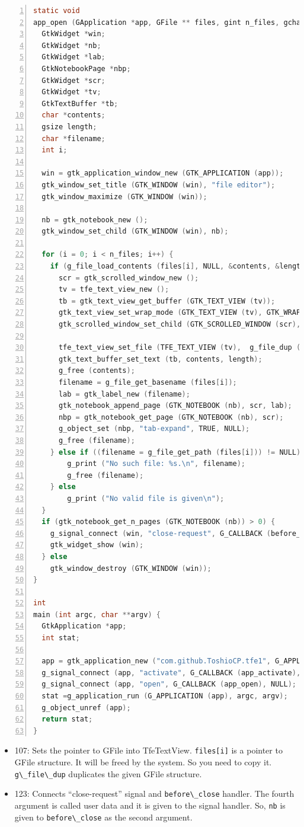 \begin{lstlisting}[language=C, numbers=left]
static void
app_open (GApplication *app, GFile ** files, gint n_files, gchar *hint, gpointer user_data) {
  GtkWidget *win;
  GtkWidget *nb;
  GtkWidget *lab;
  GtkNotebookPage *nbp;
  GtkWidget *scr;
  GtkWidget *tv;
  GtkTextBuffer *tb;
  char *contents;
  gsize length;
  char *filename;
  int i;

  win = gtk_application_window_new (GTK_APPLICATION (app));
  gtk_window_set_title (GTK_WINDOW (win), "file editor");
  gtk_window_maximize (GTK_WINDOW (win));

  nb = gtk_notebook_new ();
  gtk_window_set_child (GTK_WINDOW (win), nb);

  for (i = 0; i < n_files; i++) {
    if (g_file_load_contents (files[i], NULL, &contents, &length, NULL, NULL)) {
      scr = gtk_scrolled_window_new ();
      tv = tfe_text_view_new ();
      tb = gtk_text_view_get_buffer (GTK_TEXT_VIEW (tv));
      gtk_text_view_set_wrap_mode (GTK_TEXT_VIEW (tv), GTK_WRAP_WORD_CHAR);
      gtk_scrolled_window_set_child (GTK_SCROLLED_WINDOW (scr), tv);

      tfe_text_view_set_file (TFE_TEXT_VIEW (tv),  g_file_dup (files[i]));
      gtk_text_buffer_set_text (tb, contents, length);
      g_free (contents);
      filename = g_file_get_basename (files[i]);
      lab = gtk_label_new (filename);
      gtk_notebook_append_page (GTK_NOTEBOOK (nb), scr, lab);
      nbp = gtk_notebook_get_page (GTK_NOTEBOOK (nb), scr);
      g_object_set (nbp, "tab-expand", TRUE, NULL);
      g_free (filename);
    } else if ((filename = g_file_get_path (files[i])) != NULL) {
        g_print ("No such file: %s.\n", filename);
        g_free (filename);
    } else
        g_print ("No valid file is given\n");
  }
  if (gtk_notebook_get_n_pages (GTK_NOTEBOOK (nb)) > 0) {
    g_signal_connect (win, "close-request", G_CALLBACK (before_close), nb);
    gtk_widget_show (win);
  } else
    gtk_window_destroy (GTK_WINDOW (win));
}

int
main (int argc, char **argv) {
  GtkApplication *app;
  int stat;

  app = gtk_application_new ("com.github.ToshioCP.tfe1", G_APPLICATION_HANDLES_OPEN);
  g_signal_connect (app, "activate", G_CALLBACK (app_activate), NULL);
  g_signal_connect (app, "open", G_CALLBACK (app_open), NULL);
  stat =g_application_run (G_APPLICATION (app), argc, argv);
  g_object_unref (app);
  return stat;
}
\end{lstlisting}

\begin{itemize}
\tightlist
\item
  107: Sets the pointer to GFile into TfeTextView.
  \passthrough{\lstinline!files[i]!} is a pointer to GFile structure. It
  will be freed by the system. So you need to copy it.
  \passthrough{\lstinline!g\_file\_dup!} duplicates the given GFile
  structure.
\item
  123: Connects ``close-request'' signal and
  \passthrough{\lstinline!before\_close!} handler. The fourth argument
  is called user data and it is given to the signal handler. So,
  \passthrough{\lstinline!nb!} is given to
  \passthrough{\lstinline!before\_close!} as the second argument.
\end{itemize}

